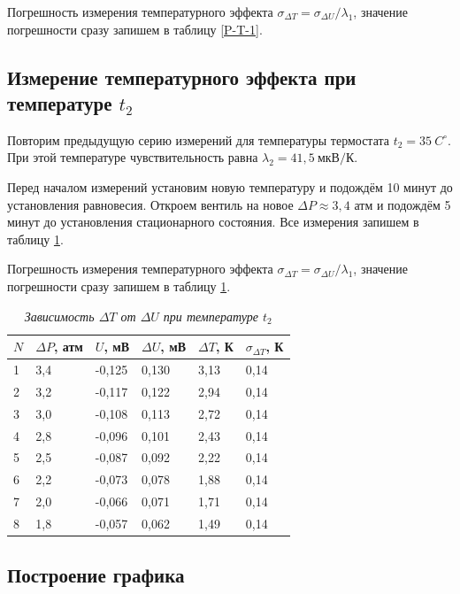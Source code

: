 \documentclass[a4paper,12pt]{article}
\begin{document}
Погрешность измерения температурного эффекта $\sigma_{\Delta T} = \sigma_{\Delta U} / \lambda_1$, значение погрешности сразу запишем в таблицу \ref{P-T-1}.

\subsection{Измерение температурного эффекта при температуре $t_2$}

Повторим предыдущую серию измерений для температуры термостата $t_2 = 35 \ C^\circ$. При этой температуре чувствительность равна $\lambda_2 = 41,5 \ \text{мкВ}/\text{К}$. 

Перед началом измерений установим новую температуру и подождём 10 минут до установления равновесия. Откроем вентиль на новое $\Delta P \approx 3,4$ атм и подождём 5 минут до установления стационарного состояния. Все измерения запишем в таблицу \ref{P-T-2}.

Погрешность измерения температурного эффекта $\sigma_{\Delta T} = \sigma_{\Delta U} / \lambda_1$, значение погрешности сразу запишем в таблицу \ref{P-T-2}.

\begin{table}[!ht]
    \centering
    \begin{tabular}{|l|l|l|l|l|l|}
    \hline
        $N$ & $\Delta P$, атм & $U$, мВ & $\Delta U$, мВ & $\Delta T$, К & $\sigma_{\Delta T}$, К \\ \hline
        1 & 3,4 & -0,125 & 0,130 & 3,13 & 0,14 \\ \hline
        2 & 3,2 & -0,117 & 0,122 & 2,94 & 0,14 \\ \hline
        3 & 3,0 & -0,108 & 0,113 & 2,72 & 0,14 \\ \hline
        4 & 2,8 & -0,096 & 0,101 & 2,43 & 0,14 \\ \hline
        5 & 2,5 & -0,087 & 0,092 & 2,22 & 0,14 \\ \hline
        6 & 2,2 & -0,073 & 0,078 & 1,88 & 0,14 \\ \hline
        7 & 2,0 & -0,066 & 0,071 & 1,71 & 0,14 \\ \hline
        8 & 1,8 & -0,057 & 0,062 & 1,49 & 0,14 \\ \hline
    \end{tabular}\caption{\textit{Зависимость $\Delta T$ от $\Delta U$ при температуре $t_2$}}\label{P-T-2}
\end{table}

\subsection{Построение графика}
\end{document}
